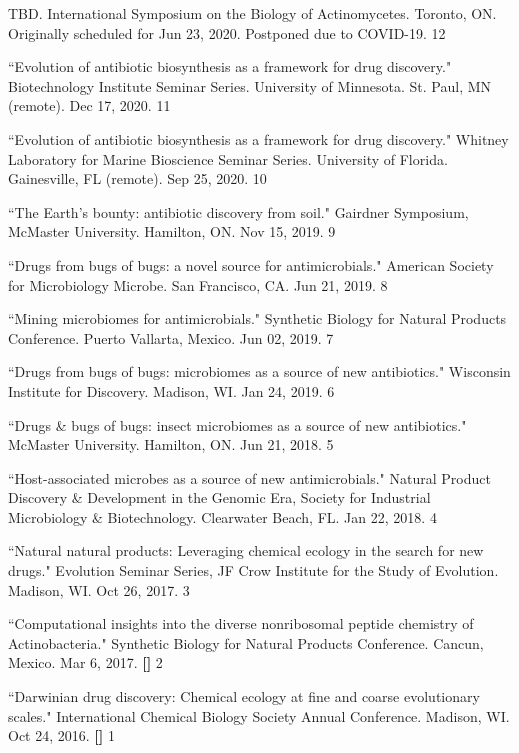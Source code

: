 
\begin{cvpubs}

\cvpub
{TBD. International Symposium on the Biology of Actinomycetes. Toronto, ON. Originally scheduled for Jun 23, 2020. Postponed due to COVID-19.}
{12}

\cvpub
{``Evolution of antibiotic biosynthesis as a framework for drug discovery." Biotechnology Institute Seminar Series. University of Minnesota. St. Paul, MN (remote). Dec 17, 2020.}
{11}

\cvpub
{``Evolution of antibiotic biosynthesis as a framework for drug discovery." Whitney Laboratory for Marine Bioscience Seminar Series. University of Florida. Gainesville, FL (remote). Sep 25, 2020.}
{10}

\cvpub
{``The Earth’s bounty: antibiotic discovery from soil." Gairdner Symposium, McMaster University. Hamilton, ON. Nov 15, 2019.}
{9}

\cvpub
{``Drugs from bugs of bugs: a novel source for antimicrobials." American Society for Microbiology Microbe. San Francisco, CA. Jun 21, 2019.}
{8}

\cvpub
{``Mining microbiomes for antimicrobials." Synthetic Biology for Natural Products Conference. Puerto Vallarta, Mexico. Jun 02, 2019.}
{7}

\cvpub
{``Drugs from bugs of bugs: microbiomes as a source of new antibiotics." Wisconsin Institute for Discovery. Madison, WI. Jan 24, 2019.}
{6}

\cvpub
{``Drugs \& bugs of bugs: insect microbiomes as a source of new antibiotics."  McMaster University. Hamilton, ON. Jun 21, 2018.}
{5}

\cvpub
{``Host-associated microbes as a source of new antimicrobials." Natural Product Discovery \& Development in the Genomic Era, Society for Industrial Microbiology \& Biotechnology. Clearwater Beach, FL. Jan 22, 2018.}
{4}

\cvpub
{``Natural natural products: Leveraging chemical ecology in the search for new drugs." Evolution Seminar Series, JF Crow Institute for the Study of Evolution. Madison, WI. Oct 26, 2017.}
{3}

\cvpub
{``Computational insights into the diverse nonribosomal peptide chemistry of Actinobacteria." Synthetic Biology for Natural Products Conference. Cancun, Mexico. Mar 6, 2017. \linebreak \textbf{[\textit{}]}}
{2}

\cvpub
{``Darwinian drug discovery: Chemical ecology at fine and coarse evolutionary scales." International Chemical Biology Society Annual Conference. Madison, WI. Oct 24, 2016. \linebreak \textbf{[\textit{}]}}
{1}

\end{cvpubs}

